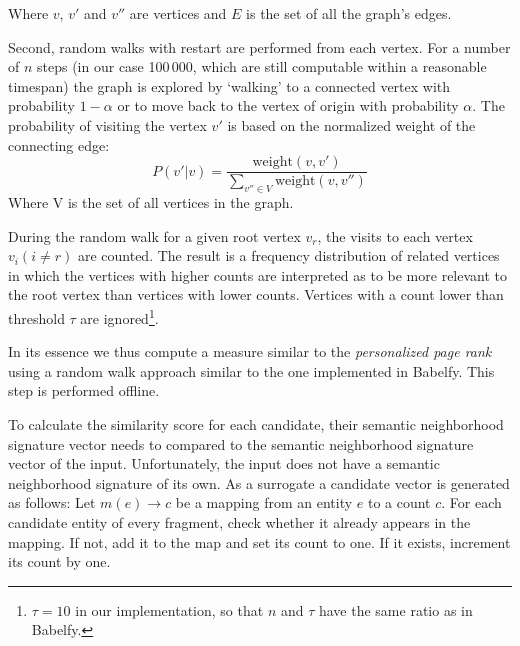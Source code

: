 \documentclass[runningheads,a4paper]{llncs}
\begin{document}
{Where $v$, $v'$ and $v''$ are vertices and $E$ is the set of all the graph's edges.

Second, random walks with restart are performed from each vertex. %
For a number of $n$ steps (in our case 100\,000, which are still computable within a reasonable timespan) the graph is explored by `walking' to a connected vertex with probability $1 - \alpha$ or to move back to the vertex of origin with probability $\alpha$. The probability of visiting the vertex $v'$ is based on the normalized weight of the connecting edge:
$$P(v'|v) = \frac{\mathrm{weight}(v, v')}{\sum\limits_{v''\in V} \mathrm{weight}(v, v'')}$$
Where V is the set of all vertices in the graph. 

During the random walk for a given root vertex $v_r$, the visits to each vertex $v_i (i \neq r)$ are counted. The result is a frequency distribution of related vertices in which the vertices with higher counts are interpreted as to be more relevant to the root vertex than vertices with lower counts. Vertices with a count lower than threshold $\tau$ are ignored\footnote{$\tau = 10$ in our implementation, so that $n$ and $\tau$ have the same ratio as in Babelfy.}.

In its essence we thus compute a measure similar to the \emph{personalized page rank} \cite{personalized_page_rank} using a random walk approach similar to the one implemented in Babelfy. This step is performed offline.

To calculate the similarity score for each candidate, their semantic neighborhood signature vector needs to compared to the semantic neighborhood signature vector of the input. Unfortunately, the input does not have a semantic neighborhood signature of its own. As a surrogate a candidate vector is generated as follows: Let $m(e) \rightarrow c$ be a mapping from an entity $e$ to a count $c$. For each candidate entity of every fragment, check whether it already appears in the mapping. If not, add it to the map and set its count to one. If it exists, increment its count by one.

}
\end{document}
